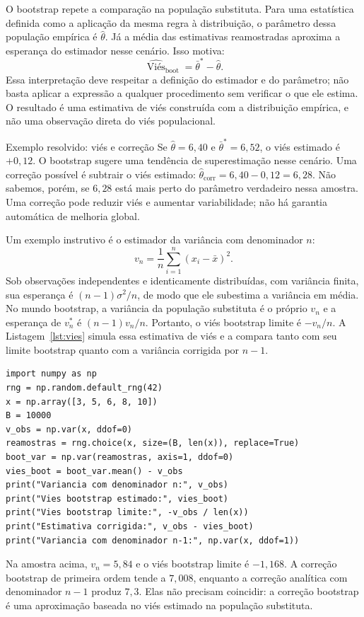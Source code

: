 \documentclass[12pt,a4paper]{article}
\begin{document}
O bootstrap repete a comparação na população substituta. Para uma estatística definida como a aplicação da mesma regra à distribuição, o parâmetro dessa população empírica é $\hat\theta$. Já a média das estimativas reamostradas aproxima a esperança do estimador nesse cenário. Isso motiva:
\[
\widehat{\operatorname{Viés}}_{\mathrm{boot}}
=\bar\theta^*-\hat\theta.
\]
Essa interpretação deve respeitar a definição do estimador e do parâmetro; não basta aplicar a expressão a qualquer procedimento sem verificar o que ele estima. O resultado é uma estimativa de viés construída com a distribuição empírica, e não uma observação direta do viés populacional.

\begin{exemplobox}{Exemplo resolvido: viés e correção}
Se $\hat\theta=6{,}40$ e $\bar\theta^*=6{,}52$, o viés estimado é $+0{,}12$. O bootstrap sugere uma tendência de superestimação nesse cenário. Uma correção possível é subtrair o viés estimado: $\hat\theta_{\mathrm{corr}}=6{,}40-0{,}12=6{,}28$. Não sabemos, porém, se $6{,}28$ está mais perto do parâmetro verdadeiro nessa amostra. Uma correção pode reduzir viés e aumentar variabilidade; não há garantia automática de melhoria global.
\end{exemplobox}

Um exemplo instrutivo é o estimador da variância com denominador $n$:
\[
v_n=\frac1n\sum_{i=1}^n(x_i-\bar x)^2.
\]
Sob observações independentes e identicamente distribuídas, com variância finita, sua esperança é $(n-1)\sigma^2/n$, de modo que ele subestima a variância em média. No mundo bootstrap, a variância da população substituta é o próprio $v_n$ e a esperança de $v_n^*$ é $(n-1)v_n/n$. Portanto, o viés bootstrap limite é $-v_n/n$. A Listagem~\ref{lst:vies} simula essa estimativa de viés e a compara tanto com seu limite bootstrap quanto com a variância corrigida por $n-1$.

\begin{lstlisting}[caption={Estimativa do viés de uma variância com denominador n.},label={lst:vies}]
import numpy as np
rng = np.random.default_rng(42)
x = np.array([3, 5, 6, 8, 10])
B = 10000
v_obs = np.var(x, ddof=0)
reamostras = rng.choice(x, size=(B, len(x)), replace=True)
boot_var = np.var(reamostras, axis=1, ddof=0)
vies_boot = boot_var.mean() - v_obs
print("Variancia com denominador n:", v_obs)
print("Vies bootstrap estimado:", vies_boot)
print("Vies bootstrap limite:", -v_obs / len(x))
print("Estimativa corrigida:", v_obs - vies_boot)
print("Variancia com denominador n-1:", np.var(x, ddof=1))
\end{lstlisting}
Na amostra acima, $v_n=5{,}84$ e o viés bootstrap limite é $-1{,}168$. A correção bootstrap de primeira ordem tende a $7{,}008$, enquanto a correção analítica com denominador $n-1$ produz $7{,}3$. Elas não precisam coincidir: a correção bootstrap é uma aproximação baseada no viés estimado na população substituta.
\end{document}
